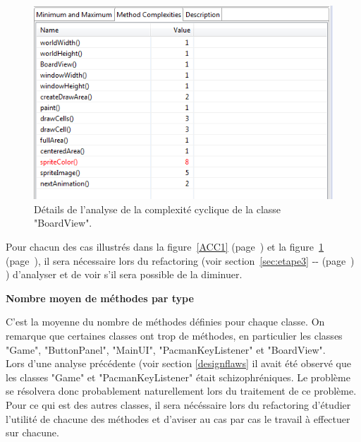 \documentclass[12pt,a4paper,final]{article}
\newcommand{\smalltitle}[1]{\bigskip\large\textbf{#1}\par\normalsize\medskip}
\newcommand{\labelfigure}[1]{figure~\ref{#1} (page~\pageref{#1})}
\newcommand{\refsection}[1]{section~\ref{#1} -\nameref{#1}- (page~\pageref{#1})}
\begin{document}
\begin{figure}[!h]
	\centering
	\includegraphics[width=\textwidth]{ACC_BoardView.png}
	\caption{\label{ACC2}Détails de l'analyse de la complexité cyclique de la classe "BoardView".}
\end{figure}
Pour chacun des cas illustrés dans la \labelfigure{ACC1} et la \labelfigure{ACC2}, il sera nécessaire lors du refactoring (voir \refsection{sec:etape3} ) d'analyser et de voir s'il sera possible de la diminuer.


\smalltitle{Nombre moyen de méthodes par type}
C'est la moyenne du nombre de méthodes définies pour chaque classe.
On remarque que certaines classes ont trop de méthodes, en particulier les classes "Game", "ButtonPanel", "MainUI", "PacmanKeyListener" et "BoardView". \\
Lors d'une analyse précédente (voir section \ref{designflaws} il avait été observé que les classes "Game" et "PacmanKeyListener" était schizophréniques. Le problème se résolvera donc probablement naturellement lors du traitement de ce problème. Pour ce qui est des autres classes, il sera nécéssaire lors du refactoring d'étudier l'utilité de chacune des méthodes et d'aviser au cas par cas le travail à effectuer sur chacune.

\clearpage
\end{document}
